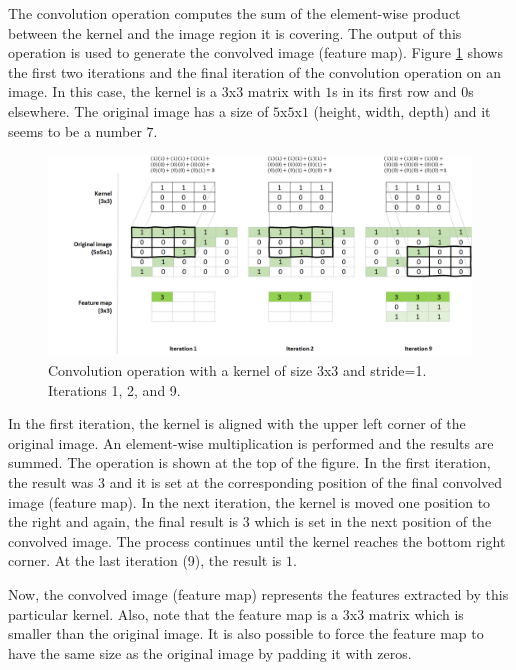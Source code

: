 \documentclass[
  11pt,
]{krantz}
\begin{document}
The convolution operation computes the sum of the element-wise product between the kernel and the image region it is covering. The output of this operation is used to generate the convolved image (feature map). Figure \ref{fig:cnnConv} shows the first two iterations and the final iteration of the convolution operation on an image. In this case, the kernel is a \(3\)x\(3\) matrix with \(1\)s in its first row and \(0\)s elsewhere. The original image has a size of \(5\)x\(5\)x\(1\) (height, width, depth) and it seems to be a number \(7\).

\begin{figure}

{\centering \includegraphics[width=1\linewidth]{images/cnn_conv_ites} 

}

\caption{Convolution operation with a kernel of size 3x3 and stride=1. Iterations 1, 2, and 9.}\label{fig:cnnConv}
\end{figure}

In the first iteration, the kernel is aligned with the upper left corner of the original image. An element-wise multiplication is performed and the results are summed. The operation is shown at the top of the figure. In the first iteration, the result was \(3\) and it is set at the corresponding position of the final convolved image (feature map). In the next iteration, the kernel is moved one position to the right and again, the final result is \(3\) which is set in the next position of the convolved image. The process continues until the kernel reaches the bottom right corner. At the last iteration (9), the result is \(1\).

Now, the convolved image (feature map) represents the features extracted by this particular kernel. Also, note that the feature map is a \(3\)x\(3\) matrix which is smaller than the original image. It is also possible to force the feature map to have the same size as the original image by padding it with zeros.
\end{document}
